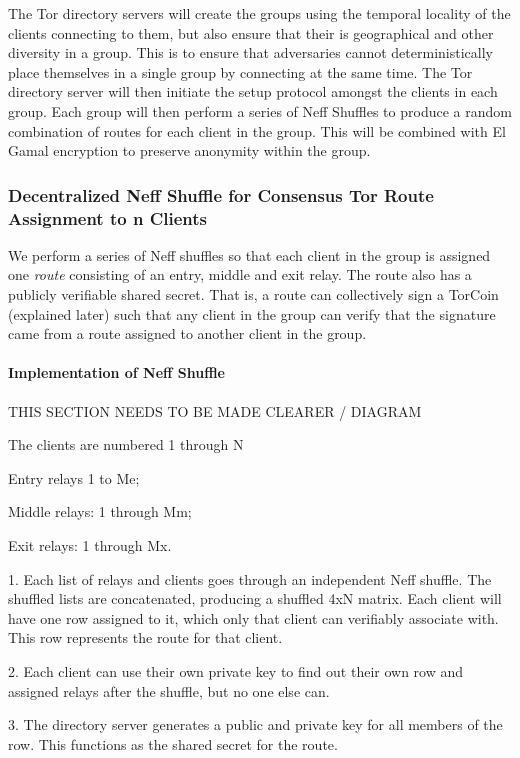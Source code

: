 The Tor directory servers will create the groups using the temporal locality of the clients connecting to them, but also ensure that their is geographical and other diversity in a group. This is to ensure that adversaries cannot deterministically place themselves in a single group by connecting at the same time.
The Tor directory server will then initiate the setup protocol amongst the clients in each group. Each group will then perform a series of Neff Shuffles to produce a random combination of routes for each client in the group. This will be combined with El Gamal encryption to preserve anonymity within the group.

\subsubsection{Decentralized Neff Shuffle for Consensus Tor Route Assignment to n Clients}
We perform a series of Neff shuffles so that each client in the group is assigned one \textit{route} consisting of an entry, middle and exit relay. The route also has a publicly verifiable shared secret. That is, a route can collectively sign a TorCoin (explained later) such that any client in the group can verify that the signature came from a route assigned to another client in the group.

\paragraph{Implementation of Neff Shuffle}

THIS SECTION NEEDS TO BE MADE CLEARER / DIAGRAM

The clients are numbered 1 through N

Entry relays 1 to Me; 

Middle relays: 1 through Mm; 

Exit relays: 1 through Mx.

1.  Each list of relays and clients goes through an independent Neff shuffle. The shuffled lists are concatenated, producing a shuffled 4xN matrix. Each client will have one row assigned to it, which only that client can verifiably associate with. This row represents the route for that client.

2.  Each client can use their own private key to find out their own row and assigned relays after the shuffle, but no one else can.

3.  The directory server generates a public and private key for all members of the row. This functions as the shared secret for the route.

